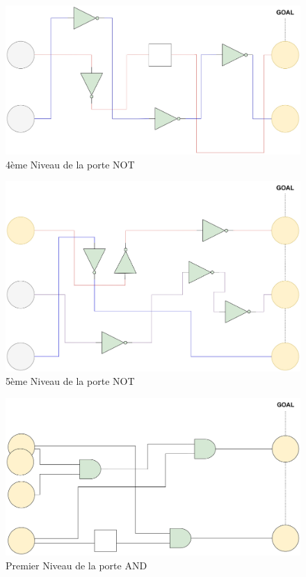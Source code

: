 \documentclass{article}
\begin{document}
\begin{figure}[h]
    \centering
    \includegraphics[width=\textwidth]{img/Levels-NOT-4.jpg}
    \caption{4ème Niveau de la porte NOT}
\end{figure}
\begin{figure}[h]
    \centering
    \includegraphics[width=\textwidth]{img/Levels-NOT-5.jpg}
    \caption{5ème Niveau de la porte NOT}
\end{figure}
\begin{figure}[h]
    \centering
    \includegraphics[width=\textwidth]{img/Levels-AND-1.jpg}
    \caption{Premier Niveau de la porte AND}
\end{figure}
\end{document}
